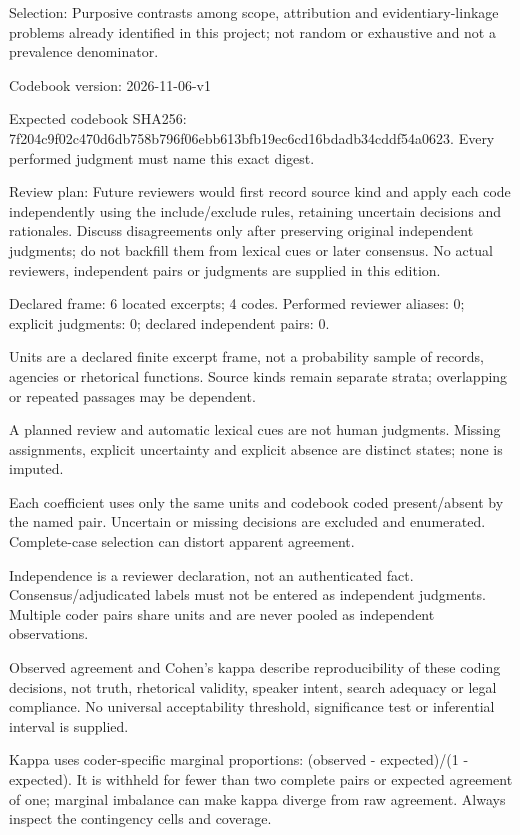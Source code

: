 \documentclass[
  english,
]{article}
\newcounter{none} %
\begin{document}
Selection: Purposive contrasts among scope, attribution and
evidentiary-linkage problems already identified in this project; not
random or exhaustive and not a prevalence denominator.

Codebook version: 2026-11-06-v1

Expected codebook SHA256:
7f204c9f02c470d6db758b796f06ebb613bfb19ec6cd16bdadb34cddf54a0623. Every
performed judgment must name this exact digest.

Review plan: Future reviewers would first record source kind and apply
each code independently using the include/exclude rules, retaining
uncertain decisions and rationales. Discuss disagreements only after
preserving original independent judgments; do not backfill them from
lexical cues or later consensus. No actual reviewers, independent pairs
or judgments are supplied in this edition.

Declared frame: 6 located excerpts; 4 codes. Performed reviewer aliases:
0; explicit judgments: 0; declared independent pairs: 0.

Units are a declared finite excerpt frame, not a probability sample of
records, agencies or rhetorical functions. Source kinds remain separate
strata; overlapping or repeated passages may be dependent.

A planned review and automatic lexical cues are not human judgments.
Missing assignments, explicit uncertainty and explicit absence are
distinct states; none is imputed.

Each coefficient uses only the same units and codebook coded
present/absent by the named pair. Uncertain or missing decisions are
excluded and enumerated. Complete-case selection can distort apparent
agreement.

Independence is a reviewer declaration, not an authenticated fact.
Consensus/adjudicated labels must not be entered as independent
judgments. Multiple coder pairs share units and are never pooled as
independent observations.

Observed agreement and Cohen's kappa describe reproducibility of these
coding decisions, not truth, rhetorical validity, speaker intent, search
adequacy or legal compliance. No universal acceptability threshold,
significance test or inferential interval is supplied.

Kappa uses coder-specific marginal proportions: (observed - expected)/(1
- expected). It is withheld for fewer than two complete pairs or
expected agreement of one; marginal imbalance can make kappa diverge
from raw agreement. Always inspect the contingency cells and coverage.
\end{document}
